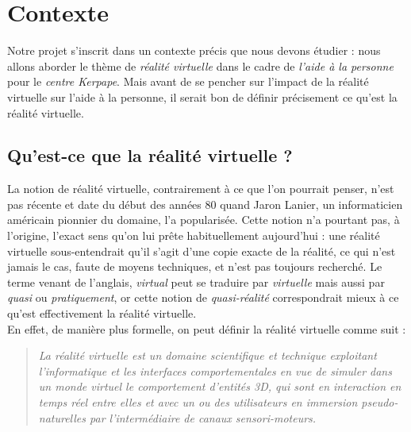 \section{Contexte}

Notre projet s'inscrit dans un contexte précis que nous devons étudier : nous allons aborder le thème de \emph{réalité virtuelle} dans le cadre de \emph{l'aide à la personne} pour le \emph{centre Kerpape}. Mais avant de se pencher sur l'impact de la réalité virtuelle sur l'aide à la personne, il serait bon de définir précisement ce qu'est la réalité virtuelle.

\subsection{Qu'est-ce que la réalité virtuelle ?}
La notion de réalité virtuelle, contrairement à ce que l'on pourrait penser, n'est pas récente et date du début des années 80 quand Jaron Lanier, un informaticien américain pionnier du domaine, l'a popularisée. Cette notion n'a pourtant pas, à l'origine, l'exact sens qu'on lui prête habituellement aujourd'hui : une réalité virtuelle sous-entendrait qu'il s'agit d'une copie exacte de la réalité, ce qui n'est jamais le cas, faute de moyens techniques, et n'est pas toujours recherché. Le terme venant  de l'anglais, \emph{virtual} peut se traduire par \emph{virtuelle} mais aussi par \emph{quasi} ou \emph{pratiquement}, or cette notion de \emph{quasi-réalité} correspondrait mieux à ce qu'est effectivement la réalité virtuelle. \\

En effet, de manière plus formelle, on peut définir la réalité virtuelle comme suit :

\begin{quote}\og \emph{La réalité virtuelle est un domaine scientifique et technique exploitant l'informatique et les interfaces comportementales en vue de simuler dans un monde virtuel le comportement d'entités 3D, qui sont en interaction en temps réel entre elles et avec un ou des utilisateurs en immersion pseudo-naturelles par l'intermédiaire de canaux sensori-moteurs.} \fg\cite{traiteRV1}\end{quote}

